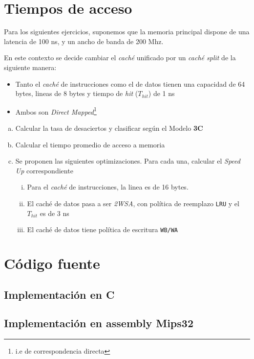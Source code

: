 \documentclass[a4paper]{article}
\begin{document}
\section{Tiempos de acceso}
Para los siguientes ejercicios, suponemos que la memoria principal dispone de una latencia de 100 ns, y un ancho de banda de 200 Mhz.

En este contexto se decide cambiar el \textit{caché} unificado por un \textit{caché split} de la siguiente manera:
\begin{itemize}
  \item Tanto el \textit{caché} de instrucciones como el de datos tienen una capacidad de 64 bytes, lineas de 8 bytes y tiempo de \textit{hit}
($T_{hit}$) de 1 ns
  \item Ambos son \textit{Direct Mapped}\footnote{i.e de correspondencia directa}
\end{itemize}

\begin{enumerate}[a.]
\item Calcular la tasa de desaciertos y clasificar según el Modelo \textbf{3C}
\item Calcular el tiempo promedio de acceso a memoria

\item Se proponen las siguientes optimizaciones. Para cada una, calcular el \textit{Speed Up} correspondiente
\begin{enumerate}[i.]
  \item Para el \textit{caché} de instrucciones, la linea es de 16 bytes.
  \item El caché de datos pasa a ser \textit{2WSA}, con política de reemplazo \texttt{LRU} y el $T_{hit}$ es de 3 ns
  \item El caché de datos tiene política de escritura \texttt{WB/WA}
\end{enumerate}

\end{enumerate}
\pagebreak

\appendix
\section{Código fuente}
\subsection{Implementación en C}
\label{sec:cod_c}


\pagebreak
\subsection{Implementación en assembly Mips32}
\end{document}
